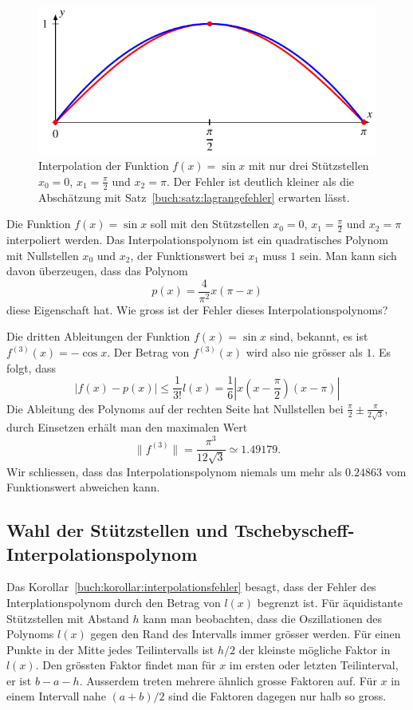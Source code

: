 \begin{beispiel}
\begin{figure}
\centering
\includegraphics{chapters/30-interpolation/figures/sin.pdf}
\caption{Interpolation der Funktion $f(x)=\sin x$ mit nur drei 
Stützstellen $x_0=0$, $x_1=\frac{\pi}2$ und $x_2=\pi$.
Der Fehler ist deutlich kleiner als die Abschätzung mit
Satz~\ref{buch:satz:lagrangefehler} erwarten lässt.
\label{buch:figure:sin}}
\end{figure}
Die Funktion $f(x)=\sin x$ soll mit den Stützstellen $x_0=0$, $x_1=\frac{\pi}2$
und $x_2=\pi$ interpoliert werden.
Das Interpolationspolynom ist ein quadratisches Polynom mit Nullstellen
$x_0$ und $x_2$, der Funktionswert bei $x_1$ muss $1$ sein.
Man kann sich davon überzeugen, dass das Polynom
\[
p(x) = \frac{4}{\pi^2} x(\pi -x )
\]
diese Eigenschaft hat.
Wie gross ist der Fehler dieses Interpolationspolynoms?

Die dritten Ableitungen der Funktion $f(x)=\sin x$ sind, bekannt, es ist
$f^{(3)}(x)=-\cos x$.
Der Betrag von $f^{(3)}(x)$ wird also nie grösser als $1$.
Es folgt, dass
\[
|f(x)-p(x)| \le \frac{1}{3!} l(x)
=
\frac16 |x(x-{\textstyle\frac{\pi}2})(x-\pi)|
\]
Die Ableitung des Polynoms auf der rechten Seite hat Nullstellen bei
$\frac{\pi}2 \pm \frac{\pi}{2\sqrt{3}}$,
durch Einsetzen erhält man den maximalen Wert
\[
\|f^{(3)}\|
=
\frac{\pi^3}{12\sqrt{3}}\simeq 1.49179.
\]
Wir schliessen, dass das Interpolationspolynom niemals um mehr als $0.24863$
vom Funktionswert abweichen kann.
\end{beispiel}

%
%
\subsection{Wahl der Stützstellen und Tschebyscheff-Interpolationspolynom
\label{buch:section:interpolation:tschebyscheff}}
Das Korollar~\ref{buch:korollar:interpolationsfehler} besagt, dass der
Fehler des Interplationspolynom durch den Betrag von $l(x)$ begrenzt
ist.
Für äquidistante Stützstellen mit Abstand $h$ kann man beobachten,
dass die Oszillationen des Polynoms $l(x)$ gegen den Rand des Intervalls
immer grösser werden.
Für einen Punkte in der Mitte jedes Teilintervalls ist $h/2$ der kleinste
mögliche Faktor in $l(x)$. 
Den grössten Faktor findet man für $x$ im ersten oder letzten Teilinterval,
er ist $b-a-h$.
Ausserdem treten mehrere ähnlich grosse Faktoren auf.
Für $x$ in einem Intervall nahe $(a+b)/2$ sind die Faktoren
dagegen nur halb so gross.

